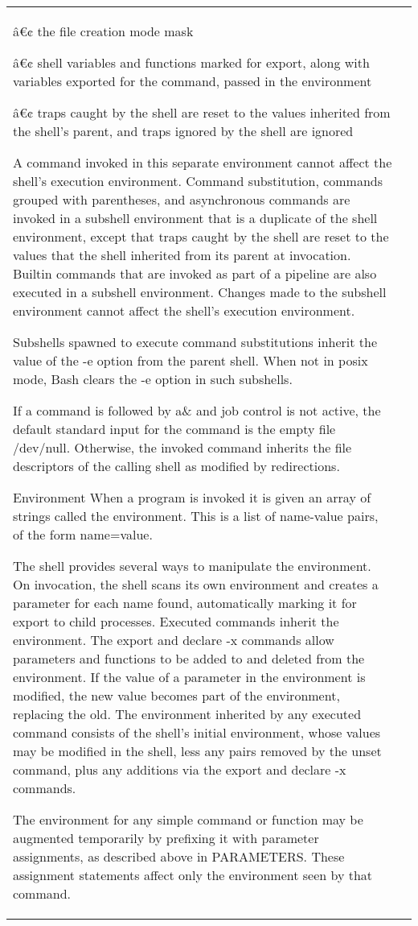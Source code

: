 \documentclass[11pt]{article}
\begin{document}
\begin{longtable}{p{}p{}}
{{{â€¢ the file creation mode mask

â€¢ shell variables and functions marked for export, along with variables exported for the command, passed in the environment

â€¢ traps caught by the shell are reset to the values inherited from the shell's parent, and traps ignored by the shell are ignored

A command invoked in this separate environment cannot affect the shell's execution environment.
Command substitution, commands grouped with parentheses, and asynchronous commands are invoked in a subshell environment that is a duplicate of the shell environment, except that traps caught by the shell are reset to the values that the shell inherited from its parent at invocation. Builtin commands that are invoked as part of a pipeline are also executed in a subshell environment. Changes made to the subshell environment cannot affect the shell's execution environment.

Subshells spawned to execute command substitutions inherit the value of the -e option from the parent shell. When not in posix mode, Bash clears the -e option in such subshells.

If a command is followed by a\& and job control is not active, the default standard input for the command is the empty file /dev/null. Otherwise, the invoked command inherits the file descriptors of the calling shell as modified by redirections.

Environment
When a program is invoked it is given an array of strings called the environment. This is a list of name-value pairs, of the form name=value.

The shell provides several ways to manipulate the environment. On invocation, the shell scans its own environment and creates a parameter for each name found, automatically marking it for export to child processes. Executed commands inherit the environment. The export and declare -x commands allow parameters and functions to be added to and deleted from the environment. If the value of a parameter in the environment is modified, the new value becomes part of the environment, replacing the old. The environment inherited by any executed command consists of the shell's initial environment, whose values may be modified in the shell, less any pairs removed by the unset command, plus any additions via the export and declare -x commands.

The environment for any simple command or function may be augmented temporarily by prefixing it with parameter assignments, as described above in PARAMETERS. These assignment statements affect only the environment seen by that command.

}}}
\end{longtable}
\end{document}
